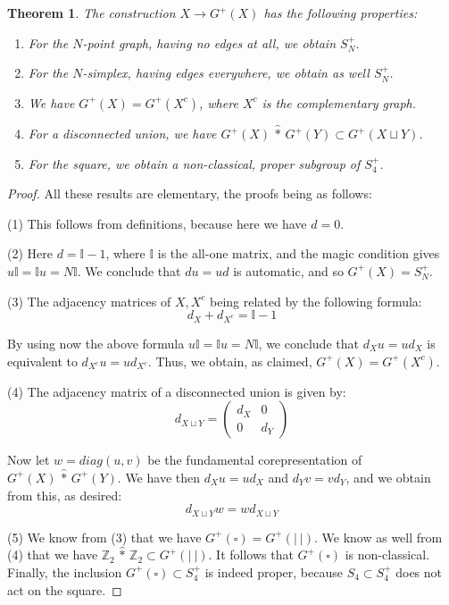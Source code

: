 \documentclass[12pt]{amsbook}
\newtheorem{theorem}{Theorem}[chapter]
\begin{document}
\begin{theorem}
The construction $X\to G^+(X)$ has the following properties:
\begin{enumerate}
\item For the $N$-point graph, having no edges at all, we obtain $S_N^+$.

\item For the $N$-simplex, having edges everywhere, we obtain as well $S_N^+$.

\item We have $G^+(X)=G^+(X^c)$, where $X^c$ is the complementary graph.

\item For a disconnected union, we have $G^+(X)\,\hat{*}\,G^+(Y)\subset G^+(X\sqcup Y)$.

\item For the square, we obtain a non-classical, proper subgroup of $S_4^+$.
\end{enumerate}
\end{theorem}

\begin{proof}
All these results are elementary, the proofs being as follows:

\medskip

(1) This follows from definitions, because here we have $d=0$.

\medskip

(2) Here $d=\mathbb I-1$, where $\mathbb I$ is the all-one matrix, and the magic condition gives $u\mathbb I=\mathbb Iu=N\mathbb I$. We conclude that $du=ud$ is automatic, and so $G^+(X)=S_N^+$.

\medskip

(3) The adjacency matrices of $X,X^c$ being related by the following formula: $$d_X+d_{X^c}=\mathbb I-1$$

By using now the above formula $u\mathbb I=\mathbb Iu=N\mathbb I$, we conclude that $d_Xu=ud_X$ is equivalent to $d_{X^c}u=ud_{X^c}$. Thus, we obtain, as claimed, $G^+(X)=G^+(X^c)$.

\medskip

(4) The adjacency matrix of a disconnected union is given by:
$$d_{X\sqcup Y}=\begin{pmatrix}
d_X&0\\
0&d_Y
\end{pmatrix}$$

Now let $w=diag(u,v)$ be the fundamental corepresentation of $G^+(X)\,\hat{*}\,G^+(Y)$. We have then $d_Xu=ud_X$ and $d_Yv=vd_Y$, and we obtain from this, as desired:
$$d_{X\sqcup Y}w=wd_{X\sqcup Y}$$

(5) We know from (3) that we have $G^+(\square)=G^+(|\ |)$. We know as well from (4) that we have $\mathbb Z_2\,\hat{*}\,\mathbb Z_2\subset G^+(|\ |)$. It follows that $G^+(\square)$ is non-classical. Finally, the inclusion $G^+(\square)\subset S_4^+$ is indeed proper, because $S_4\subset S_4^+$ does not act on the square.
\end{proof}
\end{document}
